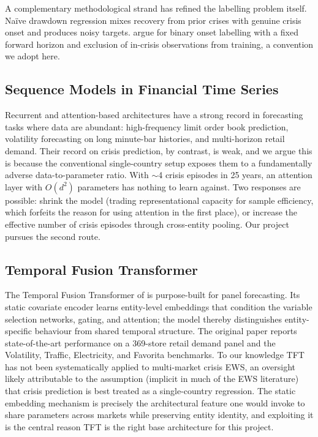 \documentclass[11pt,a4paper]{article}
\begin{document}
A complementary methodological strand has refined the labelling problem
itself. Naïve drawdown regression mixes recovery from prior crises with
genuine crisis onset and produces noisy targets. \citet{dichtl2023ews} argue
for binary onset labelling with a fixed forward horizon and exclusion of
in-crisis observations from training, a convention we adopt here.

\subsection{Sequence Models in Financial Time Series}
Recurrent and attention-based architectures have a strong record in
forecasting tasks where data are abundant: high-frequency limit order book
prediction, volatility forecasting on long minute-bar histories, and
multi-horizon retail demand. Their record on crisis prediction, by contrast,
is weak, and we argue this is because the conventional single-country setup
exposes them to a fundamentally adverse data-to-parameter ratio. With
$\sim$4 crisis episodes in 25 years, an attention layer with $O(d^2)$
parameters has nothing to learn against. Two responses are possible:
shrink the model (trading representational capacity for sample efficiency,
which forfeits the reason for using attention in the first place), or
increase the effective number of crisis episodes through cross-entity
pooling. Our project pursues the second route.

\subsection{Temporal Fusion Transformer}
The Temporal Fusion Transformer of \citet{lim2021tft} is purpose-built for
panel forecasting. Its static covariate encoder learns entity-level
embeddings that condition the variable selection networks, gating, and
attention; the model thereby distinguishes entity-specific behaviour from
shared temporal structure. The original paper reports state-of-the-art
performance on a 369-store retail demand panel and the Volatility, Traffic,
Electricity, and Favorita benchmarks. To our knowledge TFT has not been
systematically applied to multi-market crisis EWS, an oversight likely
attributable to the assumption (implicit in much of the EWS literature) that
crisis prediction is best treated as a single-country regression. The static
embedding mechanism is precisely the architectural feature one would invoke
to share parameters across markets while preserving entity identity, and
exploiting it is the central reason TFT is the right base architecture for
this project.
\end{document}

